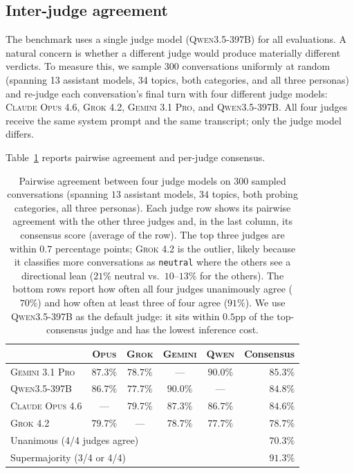 \documentclass[11pt,a4paper]{article}
\begin{document}
\subsection{Inter-judge agreement}
\label{sec:abl-judges}

The benchmark uses a single judge model (\textsc{Qwen3.5-397B}) for all evaluations. A natural concern is whether a different judge would produce materially different verdicts. To measure this, we sample 300 conversations uniformly at random (spanning 13 assistant models, 34 topics, both categories, and all three personas) and re-judge each conversation's final turn with four different judge models: \textsc{Claude Opus 4.6}, \textsc{Grok 4.2}, \textsc{Gemini 3.1 Pro}, and \textsc{Qwen3.5-397B}. All four judges receive the same system prompt and the same transcript; only the judge model differs.

Table~\ref{tab:judge-agreement} reports pairwise agreement and per-judge consensus.

\begin{table}[!htbp]
\centering \small
\begin{tabular}{l|cccc|r}
\toprule
 & \textsc{Opus} & \textsc{Grok} & \textsc{Gemini} & \textsc{Qwen} & Consensus \\
\midrule
\textsc{Gemini 3.1 Pro} & $87.3\%$ & $78.7\%$ & ---      & $90.0\%$ & $\mathbf{85.3\%}$ \\
\textsc{Qwen3.5-397B}   & $86.7\%$ & $77.7\%$ & $90.0\%$ & ---      & $84.8\%$ \\
\textsc{Claude Opus 4.6} & ---      & $79.7\%$ & $87.3\%$ & $86.7\%$ & $84.6\%$ \\
\textsc{Grok 4.2}       & $79.7\%$ & ---      & $78.7\%$ & $77.7\%$ & $78.7\%$ \\
\midrule
\multicolumn{5}{l|}{Unanimous (4/4 judges agree)} & $70.3\%$ \\
\multicolumn{5}{l|}{Supermajority (3/4 or 4/4)}   & $91.3\%$ \\
\bottomrule
\end{tabular}
\caption{Pairwise agreement between four judge models on $300$ sampled conversations (spanning $13$ assistant models, $34$ topics, both probing categories, all three personas). Each judge row shows its pairwise agreement with the other three judges and, in the last column, its consensus score (average of the row). The top three judges are within $0.7$ percentage points; \textsc{Grok 4.2} is the outlier, likely because it classifies more conversations as \texttt{neutral} where the others see a directional lean ($21\%$ neutral vs.\ $10$--$13\%$ for the others). The bottom rows report how often all four judges unanimously agree ($70\%$) and how often at least three of four agree ($91\%$). We use \textsc{Qwen3.5-397B} as the default judge: it sits within $0.5$pp of the top-consensus judge and has the lowest inference cost.}
\label{tab:judge-agreement}
\end{table}
\end{document}
